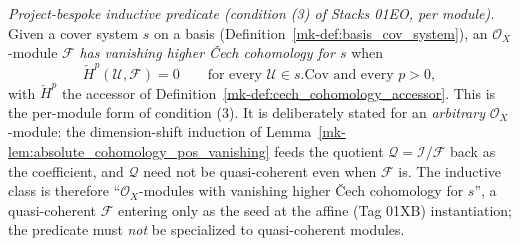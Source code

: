 \begin{definition}\label{mk-def:has_vanishing_higher_cech}
  \leanok

  \textit{Project-bespoke inductive predicate (condition (3) of Stacks 01EO, per module).}
  Given a cover system \(s\) on a basis (Definition~\ref{mk-def:basis_cov_system}), an
  \(\mathcal{O}_X\)-module \(\mathcal{F}\) \emph{has vanishing higher {\v C}ech cohomology for
  \(s\)} when
  \[
    \check{H}^p(\mathcal{U}, \mathcal{F}) = 0 \qquad
      \text{for every } \mathcal{U} \in s.\mathrm{Cov} \text{ and every } p > 0,
  \]
  with \(\check{H}^p\) the accessor of Definition~\ref{mk-def:cech_cohomology_accessor}. This is the
  per-module form of condition (3). It is deliberately stated for an \emph{arbitrary}
  \(\mathcal{O}_X\)-module: the dimension-shift induction of
  Lemma~\ref{mk-lem:absolute_cohomology_pos_vanishing} feeds the quotient \(\mathcal{Q} =
  \mathcal{I}/\mathcal{F}\) back as the coefficient, and \(\mathcal{Q}\) need not be quasi-coherent
  even when \(\mathcal{F}\) is. The inductive class is therefore ``\(\mathcal{O}_X\)-modules with
  vanishing higher {\v C}ech cohomology for \(s\)'', a quasi-coherent \(\mathcal{F}\) entering only
  as the seed at the affine (Tag 01XB) instantiation; the predicate must \emph{not} be specialized
  to quasi-coherent modules.
\end{definition}

